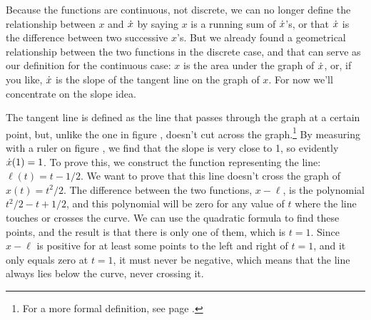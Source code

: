 Because the functions are continuous, not discrete, we can no longer define
the relationship between $x$ and $\dot{x}$ by saying $x$ is a running sum of
$\dot{x}$'s, or that $\dot{x}$ is the difference between two successive $x$'s.
But we already found a geometrical relationship between the two functions
in the discrete case, and that can serve as our definition for the continuous
case: $x$ is the area under the graph of $\dot{x}$, or, if you like,
$\dot{x}$ is the slope of the tangent line on the graph of $x$. For now
we'll concentrate on the slope idea.

%
The tangent
line is defined as the line that passes through the graph at a certain point,
but, unlike the one in figure , doesn't cut across the graph.\footnote{For a more formal definition, see
page \pageref{detour:def-tangent}.} By measuring with a ruler on figure
, we find that the slope is very close to 1, so evidently
$\dot{x}(1)=1$.
To prove this, we construct the function representing the line: $\ell(t)=t-1/2$. 
We want to prove that this line doesn't cross the graph of $x(t)=t^2/2$. The difference between the
two functions, $x-\ell$, is the polynomial $t^2/2-t+1/2$, and this polynomial will be zero for any
value of $t$ where the line touches or crosses the curve. We can use the quadratic formula
to find these points, and the result is that there is only one of them, which is $t=1$.
Since $x-\ell$ is positive for at least some points to the left and right of $t=1$, and
it only equals zero at $t=1$, it must never be negative, which means that the line
always lies below the curve, never crossing it.


